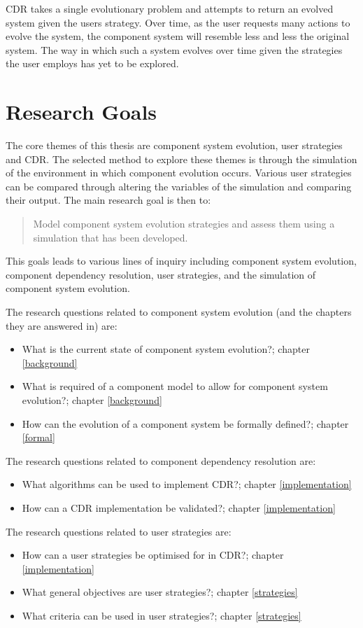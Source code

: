 CDR takes a single evolutionary problem and attempts to return an evolved system given the users strategy.
Over time, as the user requests many actions to evolve the system, the component system will resemble less and less the original system.
The way in which such a system evolves over time given the strategies the user employs has yet to be explored. 

\section{Research Goals}
The core themes of this thesis are component system evolution, user strategies and CDR.
The selected method to explore these themes is through the simulation of the environment in which component evolution occurs.
Various user strategies can be compared through altering the variables of the simulation and comparing their output.
The main research goal is then to:
\begin{quote}
Model component system evolution strategies and assess them using a simulation that has been developed.
\end{quote}

This goals leads to various lines of inquiry including component system evolution, component dependency resolution, user strategies, and the simulation of component system evolution.

The research questions related to component system evolution (and the chapters they are answered in) are:
\begin{itemize}
	\item What is the current state of component system evolution?; chapter \ref{background}
	\item What is required of a component model to allow for component system evolution?; chapter \ref{background}
	\item How can the evolution of a component system be formally defined?; chapter \ref{formal}
\end{itemize}

The research questions related to component dependency resolution are:
\begin{itemize}
  \item What algorithms can be used to implement CDR?; chapter \ref{implementation}
  \item How can a CDR implementation be validated?; chapter \ref{implementation}
\end{itemize}

The research questions related to user strategies are: 
\begin{itemize}
	\item How can a user strategies be optimised for in CDR?; chapter \ref{implementation}
	\item What general objectives are user strategies?;  chapter \ref{strategies}
	\item What criteria can be used in user strategies?; chapter \ref{strategies}
\end{itemize}

